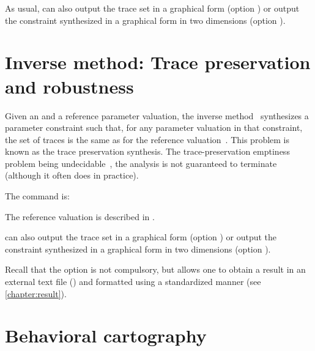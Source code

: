 As usual, \imitator{} can also
	output the trace set in a graphical form (option )
	or
	output the constraint synthesized in a graphical form in two dimensions (option ).



\section{Inverse method: Trace preservation and robustness}\label{ss:mode:IM}

Given an \NIPTA{} and a reference parameter valuation, the inverse method~\IM{} synthesizes a parameter constraint such that, for any parameter valuation in that constraint, the set of traces is the same as for the reference valuation~\cite{ACEF09}.
This problem is known as the trace preservation synthesis.
The trace-preservation emptiness problem being undecidable~\cite{AM15}, the analysis is not guaranteed to terminate (although it often does in practice).

The command is:


The reference valuation is described in .

\imitator{} can also
	output the trace set in a graphical form (option )
	or
	output the constraint synthesized in a graphical form in two dimensions (option ).

Recall that the option  is not compulsory, but allows one to obtain a result in an external text file () and formatted using a standardized manner (see \cref{chapter:result}). %




\section{Behavioral cartography}\label{ss:mode:BC}

